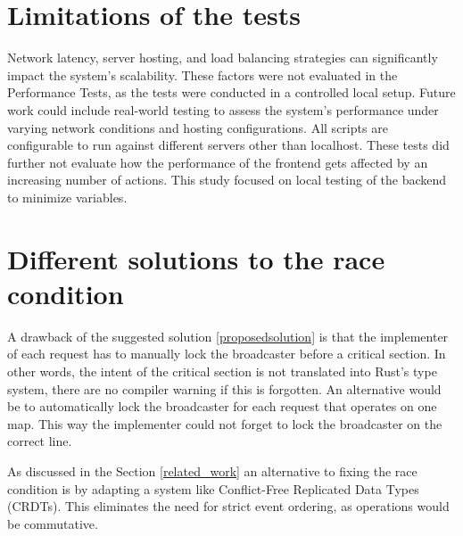 \documentclass[final,oneside]{vutinfth}
\begin{document}
\section{Limitations of the tests}

Network latency, server hosting, and load balancing strategies can significantly impact the system’s scalability.
These factors were not evaluated in the Performance Tests, as the tests were conducted in a controlled local setup.
Future work could include real-world testing to assess the system’s performance under varying network conditions and hosting configurations.
All scripts are configurable to run against different servers other than localhost.
These tests did further not evaluate how the performance of the frontend gets affected by an increasing number of actions.
This study focused on local testing of the backend to minimize variables.

\section{Different solutions to the race condition}

A drawback of the suggested solution \ref{proposedsolution} is that the implementer of each request has to manually lock the broadcaster before a critical section.
In other words, the intent of the critical section is not translated into Rust's type system, there are no compiler warning if this is forgotten.
An alternative would be to automatically lock the broadcaster for each request that operates on one map.
This way the implementer could not forget to lock the broadcaster on the correct line.

As discussed in the Section \ref{related_work} an alternative to fixing the race condition is by adapting a system like Conflict-Free Replicated Data Types (CRDTs).
This eliminates the need for strict event ordering, as operations would be commutative.

\backmatter



\end{document}
